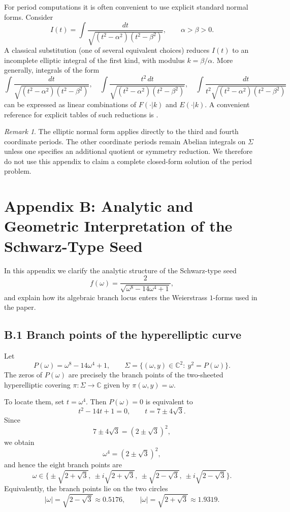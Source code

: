 \documentclass[12pt]{article}
\numberwithin{equation}{section}
\theoremstyle{definition}
\theoremstyle{remark}
\newtheorem{remark}[theorem]{Remark}
\begin{document}
For period computations it is often convenient to use explicit standard normal forms.
Consider
\[
I(t)=\int \frac{dt}{\sqrt{(t^2-\alpha^2)(t^2-\beta^2)}},
\qquad \alpha>\beta>0.
\]
A classical substitution (one of several equivalent choices) reduces $I(t)$ to an incomplete elliptic integral of the first kind, with modulus $k=\beta/\alpha$.
More generally, integrals of the form
\[
\int \frac{dt}{\sqrt{(t^2-\alpha^2)(t^2-\beta^2)}},\quad
\int \frac{t^2\,dt}{\sqrt{(t^2-\alpha^2)(t^2-\beta^2)}},\quad
\int \frac{dt}{t^2\sqrt{(t^2-\alpha^2)(t^2-\beta^2)}}
\]
can be expressed as linear combinations of $F(\cdot|k)$ and $E(\cdot|k)$.
A convenient reference for explicit tables of such reductions is \cite{ByrdFriedman}.

\begin{remark}
The elliptic normal form applies directly to the third and fourth coordinate periods.  The other coordinate periods remain Abelian integrals on $\Sigma$ unless one specifies an additional quotient or symmetry reduction.  We therefore do not use this appendix to claim a complete closed-form solution of the period problem.
\end{remark}


\section*{Appendix B: Analytic and Geometric Interpretation of the Schwarz-Type Seed} \label{sec:appendixB}

In this appendix we clarify the analytic structure of the Schwarz-type seed
\[
f(\omega)=\frac{2}{\sqrt{\omega^8-14\omega^4+1}},
\]
and explain how its algebraic branch locus enters the Weierstrass $1$-forms used in the paper.

\subsection*{B.1 Branch points of the hyperelliptic curve}

Let
\[
P(\omega)=\omega^8-14\omega^4+1,
\qquad
\Sigma=\{(\omega,y)\in\mathbb{C}^2:\ y^2=P(\omega)\}.
\]
The zeros of $P(\omega)$ are precisely the branch points of the two-sheeted hyperelliptic covering
$\pi:\Sigma\to\mathbb{C}$ given by $\pi(\omega,y)=\omega$.

To locate them, set $t=\omega^4$. Then $P(\omega)=0$ is equivalent to
\[
t^2-14t+1=0,
\qquad
t=7\pm4\sqrt{3}.
\]
Since
\[
7\pm4\sqrt{3}=(2\pm\sqrt{3})^2,
\]
we obtain
\[
\omega^4=(2\pm\sqrt{3})^2,
\]
and hence the eight branch points are
\[
\omega\in
\Big\{
\pm\sqrt{2+\sqrt{3}},\ \pm i\sqrt{2+\sqrt{3}},\
\pm\sqrt{2-\sqrt{3}},\ \pm i\sqrt{2-\sqrt{3}}
\Big\}.
\]
Equivalently, the branch points lie on the two circles
\[
|\omega|=\sqrt{2-\sqrt{3}}\approx0.5176,
\qquad
|\omega|=\sqrt{2+\sqrt{3}}\approx1.9319.
\]
\end{document}
